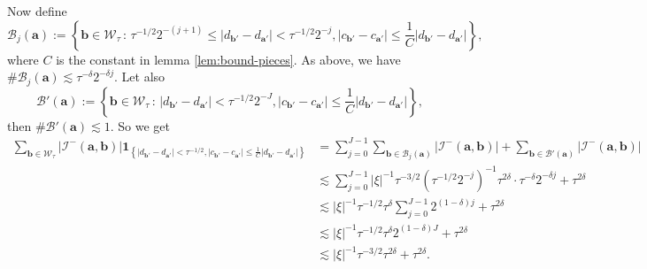 \documentclass[12pt]{amsart}
\newcommand*\abs[1]{
	\left|#1\right|
}
\theoremstyle{definition}
\renewcommand{\leq}{\leqslant}
\begin{document}
Now define
\[\mathcal{B}_j(\mathbf{a}) := \left\{\mathbf{b} \in \mathcal{W}_\tau\,:\,\tau^{-1/2}2^{-(j + 1)} \leq \abs{d_{\mathbf{b}'} - d_{\mathbf{a}'}} < \tau^{-1/2}2^{-j}, \abs{c_{\mathbf{b}'} - c_{\mathbf{a}'}} \leq \frac{1}{C}\abs{d_{\mathbf{b}'} - d_{\mathbf{a}'}}\right\},\]
where $C$ is the constant in lemma \ref{lem:bound-pieces}. As above, we have $\#\mathcal{B}_j(\mathbf{a})
\lesssim \tau^{-\delta}2^{-\delta j}$. Let also
\[\mathcal{B}'(\mathbf{a}) := \left\{\mathbf{b} \in \mathcal{W}_\tau\,:\, \abs{d_{\mathbf{b}'} - d_{\mathbf{a}'}} < \tau^{-1/2}2^{-J}, \abs{c_{\mathbf{b}'} - c_{\mathbf{a}'}} \leq \frac{1}{C}\abs{d_{\mathbf{b}'} - d_{\mathbf{a}'}}\right\},\]
then $\#\mathcal{B}'(\mathbf{a}) \lesssim 1$. So we get
\begin{align*}
\sum_{\mathbf{b} \in \mathcal{W}_\tau} \abs{\mathcal{I}^{-}(\mathbf{a}, \mathbf{b})}\mathbf{1}_{\left\{\abs{d_{\mathbf{b}'} - d_{\mathbf{a}'}} < \tau^{-1/2}, \abs{c_{\mathbf{b}'} - c_{\mathbf{a}'}} \leq \frac{1}{C}\abs{d_{\mathbf{b}'} - d_{\mathbf{a}'}}\right\}  }
&= \sum_{j = 0}^{J - 1}\sum_{\mathbf{b} \in \mathcal{B}_j(\mathbf{a})} \abs{\mathcal{I}^{-}(\mathbf{a}, \mathbf{b})} + \sum_{\mathbf{b} \in \mathcal{B}'(\mathbf{a})} \abs{\mathcal{I}^{-}(\mathbf{a}, \mathbf{b})} \\
&\lesssim \sum_{j = 0}^{J - 1} \abs{\xi}^{-1}\tau^{-3/2}\left(\tau^{-1/2}2^{-j}\right)^{-1}\tau^{2\delta}\cdot\tau^{-\delta}2^{-\delta j} + \tau^{2\delta} \\
&\lesssim \abs{\xi}^{-1} \tau^{-1/2}\tau^{\delta} \sum_{j = 0}^{J - 1}2^{(1-\delta)j} + \tau^{2\delta} \\
&\lesssim \abs{\xi}^{-1} \tau^{-1/2}\tau^{\delta}2^{(1 - \delta)J} + \tau^{2\delta} \\
&\lesssim \abs{\xi}^{-1}\tau^{-3/2}\tau^{2\delta} + \tau^{2\delta}.
\end{align*}
\end{document}
